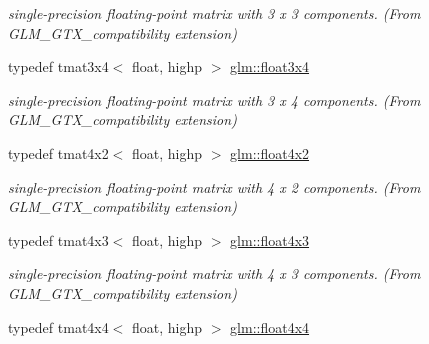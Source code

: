 \begin{DoxyCompactItemize}
\begin{DoxyCompactList}\small\item\em single-\/precision floating-\/point matrix with 3 x 3 components. (From G\-L\-M\-\_\-\-G\-T\-X\-\_\-compatibility extension) \end{DoxyCompactList}\item 
\hypertarget{group__gtx__compatibility_gadbca4a528b4ef17b78afe91c00420087}{typedef tmat3x4$<$ float, highp $>$ \hyperlink{group__gtx__compatibility_gadbca4a528b4ef17b78afe91c00420087}{glm\-::float3x4}}\label{group__gtx__compatibility_gadbca4a528b4ef17b78afe91c00420087}

\begin{DoxyCompactList}\small\item\em single-\/precision floating-\/point matrix with 3 x 4 components. (From G\-L\-M\-\_\-\-G\-T\-X\-\_\-compatibility extension) \end{DoxyCompactList}\item 
\hypertarget{group__gtx__compatibility_ga4cb477bf8e9167ab065aa70c7767e329}{typedef tmat4x2$<$ float, highp $>$ \hyperlink{group__gtx__compatibility_ga4cb477bf8e9167ab065aa70c7767e329}{glm\-::float4x2}}\label{group__gtx__compatibility_ga4cb477bf8e9167ab065aa70c7767e329}

\begin{DoxyCompactList}\small\item\em single-\/precision floating-\/point matrix with 4 x 2 components. (From G\-L\-M\-\_\-\-G\-T\-X\-\_\-compatibility extension) \end{DoxyCompactList}\item 
\hypertarget{group__gtx__compatibility_gaa0c1ca31e5e064223cc7cfc0344ac787}{typedef tmat4x3$<$ float, highp $>$ \hyperlink{group__gtx__compatibility_gaa0c1ca31e5e064223cc7cfc0344ac787}{glm\-::float4x3}}\label{group__gtx__compatibility_gaa0c1ca31e5e064223cc7cfc0344ac787}

\begin{DoxyCompactList}\small\item\em single-\/precision floating-\/point matrix with 4 x 3 components. (From G\-L\-M\-\_\-\-G\-T\-X\-\_\-compatibility extension) \end{DoxyCompactList}\item 
\hypertarget{group__gtx__compatibility_ga67688a2f2fc6386544d1a47a5d430467}{typedef tmat4x4$<$ float, highp $>$ \hyperlink{group__gtx__compatibility_ga67688a2f2fc6386544d1a47a5d430467}{glm\-::float4x4}}\label{group__gtx__compatibility_ga67688a2f2fc6386544d1a47a5d430467}


\end{DoxyCompactItemize}
